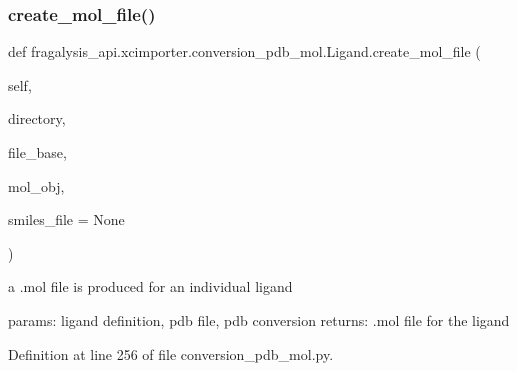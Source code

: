 \mbox{\label{classfragalysis__api_1_1xcimporter_1_1conversion__pdb__mol_1_1_ligand_a811498c568a5f12e8047ced3640a3c90}} 
\subsubsection{\texorpdfstring{create\+\_\+mol\+\_\+file()}{create\_mol\_file()}}
{\footnotesize\ttfamily def fragalysis\+\_\+api.\+xcimporter.\+conversion\+\_\+pdb\+\_\+mol.\+Ligand.\+create\+\_\+mol\+\_\+file (\begin{DoxyParamCaption}\item[{}]{self,  }\item[{}]{directory,  }\item[{}]{file\+\_\+base,  }\item[{}]{mol\+\_\+obj,  }\item[{}]{smiles\+\_\+file = {\ttfamily None} }\end{DoxyParamCaption})}

\begin{DoxyVerb}a .mol file is produced for an individual ligand

params: ligand definition, pdb file, pdb conversion
returns: .mol file for the ligand
\end{DoxyVerb}
 

Definition at line 256 of file conversion\+\_\+pdb\+\_\+mol.\+py.


